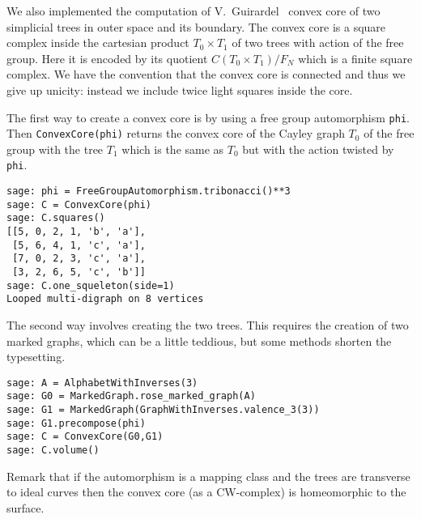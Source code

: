 \documentclass[10pt,a4paper]{article}
\newcommand{\FN}{F_N}
\begin{document}
We also implemented the computation of V.~Guirardel~\cite{guir-core}
convex core of two simplicial trees in outer space and its
boundary. The convex core is a square complex inside the cartesian
product $T_0\times T_1$
of two trees with action of the free group. Here it is encoded by its
quotient $C(T_0\times T_1)/\FN$
which is a finite square complex.  We have the convention that the
convex core is connected and thus we give up unicity: instead we
include twice light squares inside the core.


The first way to create a convex core is by using a free group
automorphism \texttt{phi}. Then \texttt{ConvexCore(phi)} returns the
convex core of the Cayley graph $T_0$
of the free group with the tree $T_1$
which is the same as $T_0$
but with the action twisted by \texttt{phi}.
\begin{verbatim}
sage: phi = FreeGroupAutomorphism.tribonacci()**3
sage: C = ConvexCore(phi)
sage: C.squares()
[[5, 0, 2, 1, 'b', 'a'],
 [5, 6, 4, 1, 'c', 'a'],
 [7, 0, 2, 3, 'c', 'a'],
 [3, 2, 6, 5, 'c', 'b']]
sage: C.one_squeleton(side=1)
Looped multi-digraph on 8 vertices
\end{verbatim}

The second way involves creating the two trees. This requires the
creation of two marked graphs, which can be a little teddious, but
some methods shorten the typesetting.
\begin{verbatim}
sage: A = AlphabetWithInverses(3)
sage: G0 = MarkedGraph.rose_marked_graph(A)
sage: G1 = MarkedGraph(GraphWithInverses.valence_3(3))
sage: G1.precompose(phi)
sage: C = ConvexCore(G0,G1)
sage: C.volume()
\end{verbatim}

Remark that if the automorphism is a mapping class and the trees are
transverse to ideal curves then the convex core (as a CW-complex) is
homeomorphic to the surface.

\printindex



\end{document}
